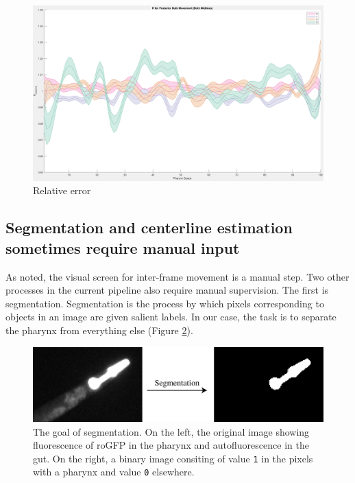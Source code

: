 \begin{figure}[ht]
    \centering
    \includegraphics[scale=0.25]{Figures/rendered_files/R_posterior_movement}
    \decoRule
    \caption[Error by strategy in the natural data set]{Relative error}
    \label{fig:RPosteriorMovement}
\end{figure}

\subsection{Segmentation and centerline estimation sometimes require manual input}\label{limitationManual}

As noted, the visual screen for inter-frame movement is a manual step. Two other processes in the current pipeline also require manual supervision. The first is segmentation. Segmentation is the process by which pixels corresponding to objects in an image are given salient labels. In our case, the task is to separate the pharynx from everything else (Figure \ref{fig:SegmentationExample}). 

\begin{figure}[ht]
    \centering
    \includegraphics[scale=.25]{Figures/rendered_files/segmentation_description}
    \decoRule
    \caption[The goal of segmentation]{The goal of segmentation. On the left, the original image showing fluorescence of roGFP in the pharynx and autofluorescence in the gut. On the right, a binary image consiting of value \texttt{1} in the pixels with a pharynx and value \texttt{0} elsewhere.}
    \label{fig:SegmentationExample}
\end{figure}

